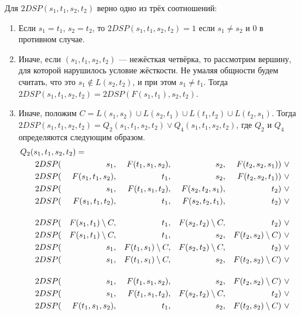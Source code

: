 \begin{theorem} \label{main_theorem}
Для $2DSP(s_1, t_1, s_2, t_2)$ верно одно из трёх соотношений:
\begin{enumerate} 
\item Если $s_1 = t_1$, $s_2 = t_2$, то $2DSP(s_1, t_1, s_2, t_2) = 1$ если $s_1 \neq s_2$ и $0$ в противном случае.
\item Иначе, если $(s_1, t_1, s_2, t_2)$ --- нежёсткая четвёрка, то рассмотрим вершину, для которой нарушилось условие жёсткости. Не умаляя общности будем считать, что это $s_1 \notin L(s_2, t_2)$, и при этом $s_1 \neq t_1$. Тогда $2DSP(s_1, t_1, s_2, t_2) = 2DSP(F(s_1, t_1), s_2, t_2)$.
\item Иначе, положим $C = L(s_1, s_2) \cup L(s_2, t_1) \cup L(t_1, t_2) \cup L(t_2, s_1)$. Тогда $2DSP(s_1, t_1, s_2, t_2) = Q_2(s_1, t_1, s_2, t_2) \vee Q_4(s_1, t_1, s_2, t_2)$, где $Q_2$ и $Q_4$ определяются следующим образом.
\begin{align}
Q_2(s_1, t_1, s_2, t_2) =\hspace{-1cm}\\
    2DSP(&& s_1              ,&& F(t_1, s_1, s_2) ,&& s_2              ,&& F(t_2, s_2, s_1) &)~\vee \\
    2DSP(&& F(s_1, t_1, s_2) ,&& t_1              ,&& s_2              ,&& F(t_2, s_2, t_1) &)~\vee \\
    2DSP(&& s_1              ,&& F(t_1, s_1, t_2) ,&& F(s_2, t_2, s_1) ,&& t_2              &)~\vee \\
    2DSP(&& F(s_1, t_1, t_2) ,&& t_1              ,&& F(s_2, t_2, t_1) ,&& t_2              &)~\vee \\[0.4cm]
    2DSP(&& F(s_1, t_1) \sm C,&& t_1              ,&& F(s_2, t_2) \sm C,&& t_2              &)~\vee \\ 
    2DSP(&& F(s_1, t_1) \sm C,&& t_1              ,&& s_2              ,&& F(t_2, s_2) \sm C&)~\vee \\ 
    2DSP(&& s_1              ,&& F(t_1, s_1) \sm C,&& F(s_2, t_2) \sm C,&& t_2              &)~\vee \\ 
    2DSP(&& s_1              ,&& F(t_1, s_1) \sm C,&& s_2              ,&& F(t_2, s_2) \sm C&)~\vee \\[0.4cm]
    2DSP(&& s_1              ,&& F(t_1, s_1, s_2) ,&& s_2              ,&& F(t_2, s_2) \sm C&)~\vee \\
    2DSP(&& s_1              ,&& F(t_1, s_1, t_2) ,&& F(s_2, t_2) \sm C,&& t_2              &)~\vee \\
    2DSP(&& F(t_1, s_1, s_2) ,&& t_1              ,&& s_2              ,&& F(t_2, s_2) \sm C&)~\vee \\

\end{align}
\end{enumerate}
\end{theorem}
